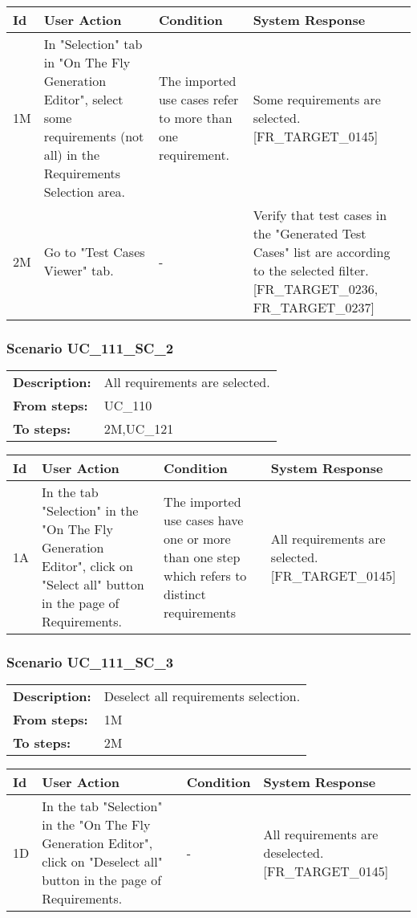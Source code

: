 \documentclass[a4paper,11pt]{article}
\newcommand{\bl}{\\ \hline}
\begin{document}
\begin{tabular}{|p{0.8in}|p{1.6in}|p{1.6in}|p{1.6in}|}
\hline
Id & User Action & Condition & System Response  \bl 
1M & In "Selection" tab in "On The Fly Generation Editor", select some requirements (not all) in the Requirements Selection area. & The imported use cases refer to more than one requirement. & Some requirements are selected. [FR_TARGET_0145] \bl 
2M & Go to "Test Cases Viewer" tab. & - & Verify that test cases in the "Generated Test Cases" list are according to the selected filter. [FR_TARGET_0236, FR_TARGET_0237] \bl 
\end{tabular}
\subsubsection*{Scenario UC_111_SC_2}
\begin{tabular}{p{1in}p{4in}}
{\bf Description:} & All requirements are selected. \\
{\bf From steps:} & UC_110#2M \\
{\bf To steps:} & 2M,UC_121#1M \\
\end{tabular}
 
\begin{tabular}{|p{0.8in}|p{1.6in}|p{1.6in}|p{1.6in}|}
\hline
Id & User Action & Condition & System Response  \bl 
1A & In the tab "Selection" in the "On The Fly Generation Editor", click on "Select all" button in the page of Requirements. & The imported use cases have one or more than one step which refers to distinct requirements & All requirements are selected. [FR_TARGET_0145] \bl 
\end{tabular}
\subsubsection*{Scenario UC_111_SC_3}
\begin{tabular}{p{1in}p{4in}}
{\bf Description:} & Deselect all requirements selection. \\
{\bf From steps:} & 1M \\
{\bf To steps:} & 2M \\
\end{tabular}
 
\begin{tabular}{|p{0.8in}|p{1.6in}|p{1.6in}|p{1.6in}|}
\hline
Id & User Action & Condition & System Response  \bl 
1D & In the tab "Selection" in the "On The Fly Generation Editor", click on "Deselect all" button in the page of Requirements. & - & All requirements are deselected. [FR_TARGET_0145] \bl 
\end{tabular}
\end{document}
